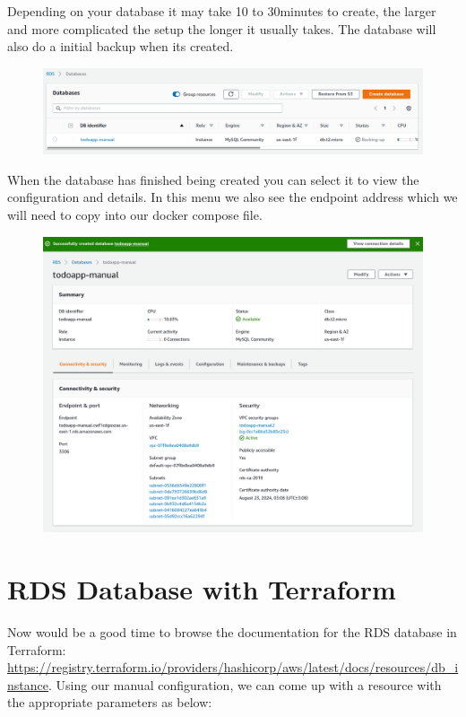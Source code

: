 \documentclass{csse4400}
\begin{document}
Depending on your database it may take 10 to 30minutes to create, the larger and more complicated the setup the longer it usually takes. The database will also do a initial backup when its created.

\begin{figure}[H]
  \includegraphics[width=\textwidth]{images/aws_4}
\end{figure}

When the database has finished being created you can select it to view the configuration and details. In this menu we also see the endpoint address which we will need to copy into our docker compose file.

\begin{figure}[H]
  \includegraphics[width=\textwidth]{images/aws_5}
\end{figure}

\section{RDS Database with Terraform}

Now would be a good time to browse the documentation for the RDS database in Terraform:
\url{https://registry.terraform.io/providers/hashicorp/aws/latest/docs/resources/db_instance}.
Using our manual configuration, we can come up with a resource with the appropriate parameters as below:
\end{document}
